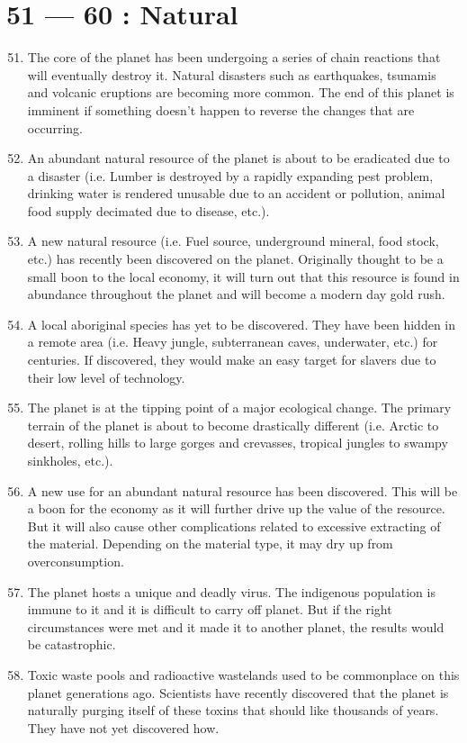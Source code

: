 \documentclass{article}
\begin{document}
\section*{51 --- 60 : Natural}
\begin{enumerate}
	\setcounter{enumi}{50}
	\item The core of the planet has been undergoing a series of chain reactions that will eventually destroy it. Natural disasters such as earthquakes, tsunamis and volcanic eruptions are becoming more common. The end of this planet is imminent if something doesn’t happen to reverse the changes that are occurring.
	\item An abundant natural resource of the planet is about to be eradicated due to a disaster (i.e. Lumber is destroyed by a rapidly expanding pest problem, drinking water is rendered unusable due to an accident or pollution, animal food supply decimated due to disease, etc.).
	\item A new natural resource (i.e. Fuel source, underground mineral, food stock, etc.) has recently been discovered on the planet. Originally thought to be a small boon to the local economy, it will turn out that this resource is found in abundance throughout the planet and will become a modern day gold rush.
	\item A local aboriginal species has yet to be discovered. They have been hidden in a remote area (i.e. Heavy jungle, subterranean caves, underwater, etc.) for centuries. If discovered, they would make an easy target for slavers due to their low level of technology.
	\item The planet is at the tipping point of a major ecological change. The primary terrain of the planet is about to become drastically different (i.e. Arctic to desert, rolling hills to large gorges and crevasses, tropical jungles to swampy sinkholes, etc.).
	\item A new use for an abundant natural resource has been discovered. This will be a boon for the economy as it will further drive up the value of the resource. But it will also cause other complications related to excessive extracting of the material. Depending on the material type, it may dry up from overconsumption.
	\item The planet hosts a unique and deadly virus. The indigenous population is immune to it and it is difficult to carry off planet. But if the right circumstances were met and it made it to another planet, the results would be catastrophic.
	\item Toxic waste pools and radioactive wastelands used to be commonplace on this planet generations ago. Scientists have recently discovered that the planet is naturally purging itself of these toxins that should like thousands of years. They have not yet discovered how.

\end{enumerate}
\end{document}
